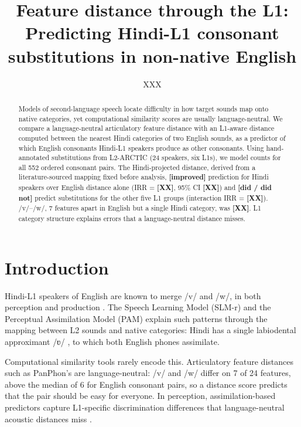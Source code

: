\documentclass[a4paper,11pt,twocolumn]{article}
\title{Feature distance through the L1: Predicting Hindi-L1 consonant substitutions in non-native English}
\author{XXX}
\newcommand{\ipa}[1]{{\ipafont #1}}
\newcommand{\res}[1]{\textbf{[#1]}} %
\begin{document}
\maketitle

\begin{abstract}
Models of second-language speech locate difficulty in how target sounds map onto native categories, yet computational similarity scores are usually language-neutral. We compare a language-neutral articulatory feature distance with an L1-aware distance computed between the nearest Hindi categories of two English sounds, as a predictor of which English consonants Hindi-L1 speakers produce as other consonants. Using hand-annotated substitutions from L2-ARCTIC (24 speakers, six L1s), we model counts for all 552 ordered consonant pairs. The Hindi-projected distance, derived from a literature-sourced mapping fixed before analysis, \res{improved} prediction for Hindi speakers over English distance alone (IRR = \res{XX}, 95\% CI \res{XX}) and \res{did / did not} predict substitutions for the other five L1 groups (interaction IRR = \res{XX}). \ipa{/v/}--\ipa{/w/}, 7 features apart in English but a single Hindi category, was \res{XX}. L1 category structure explains errors that a language-neutral distance misses.
\end{abstract}


\section{Introduction}

Hindi-L1 speakers of English are known to merge \ipa{/v/} and \ipa{/w/}, in both perception \cite{Grover:2021,Iverson:2011} and production \cite{Grover:2025,Fuchs:2019}. The Speech Learning Model (SLM-r) \cite{Flege:1995,FlegeBohn:2021} and the Perceptual Assimilation Model (PAM) \cite{Best:1995,TylerBest:2024} explain such patterns through the mapping between L2 sounds and native categories: Hindi has a single labiodental approximant \ipa{/ʋ/} \cite{Ohala:1994}, to which both English phones assimilate.

Computational similarity tools rarely encode this. Articulatory feature distances such as PanPhon's \cite{Mortensen:2016} are language-neutral: \ipa{/v/} and \ipa{/w/} differ on 7 of 24 features, above the median of 6 for English consonant pairs, so a distance score predicts that the pair should be easy for everyone. In perception, assimilation-based predictors capture L1-specific discrimination differences that language-neutral acoustic distances miss \cite{MilletDunbar:2022}.
\end{document}
